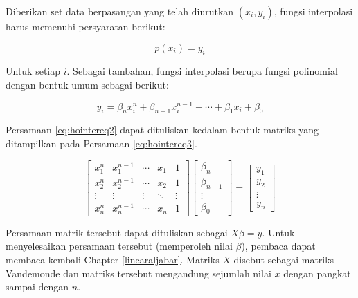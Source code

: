 \documentclass[
]{book}
\theoremstyle{definition}
\theoremstyle{definition}
\theoremstyle{definition}
\theoremstyle{definition}
\theoremstyle{remark}
\begin{document}
Diberikan set data berpasangan yang telah diurutkan \(\left(x_i,y_i\right)\), fungsi interpolasi harus memenuhi persyaratan berikut:

\begin{equation}
p\left(x_i\right)=y_i
  \label{eq:hointereq}
\end{equation}

Untuk setiap \(i\). Sebagai tambahan, fungsi interpolasi berupa fungsi polinomial dengan bentuk umum sebagai berikut:

\begin{equation}
y_i=\beta_nx_i^n+\beta_{n-1}x_i^{n-1}+\cdots+\beta_1x_i+\beta_0
  \label{eq:hointereq2}
\end{equation}

Persamaan \eqref{eq:hointereq2} dapat dituliskan kedalam bentuk matriks yang ditampilkan pada Persamaan \eqref{eq:hointereq3}.

\begin{equation}
\begin{bmatrix}
     x_1^n   & x_1^{n-1} & \cdots & x_1  & 1            \\[0.3em]
     x_2^n   & x_2^{n-1} & \cdots & x_2  & 1           \\[0.3em]
     \vdots  & \vdots    & \vdots &\ddots& \vdots            \\[0.3em]
     x_n^n   & x_n^{n-1} & \cdots & x_n  & 1
     \end{bmatrix}
\begin{bmatrix}
     \beta_n                                          \\[0.3em]
     \beta_{n-1}                                      \\[0.3em]
     \vdots                                           \\[0.3em]
     \beta_0                                       
     \end{bmatrix}
= \begin{bmatrix}
     y_1                                          \\[0.3em]
     y_2                                          \\[0.3em]
     \vdots                                       \\[0.3em]
     y_n                                       
     \end{bmatrix}
  \label{eq:hointereq3}
\end{equation}

Persamaan matrik tersebut dapat dituliskan sebagai \(X\beta = y\). Untuk menyelesaikan persamaan tersebut (memperoleh nilai \(\beta\)), pembaca dapat membaca kembali Chapter \ref{linearaljabar}. Matriks \(X\) disebut sebagai matriks Vandemonde dan matriks tersebut mengandung sejumlah nilai \(x\) dengan pangkat sampai dengan \(n\).
\end{document}

